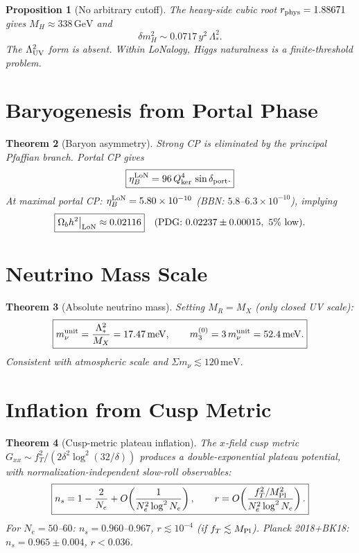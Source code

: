 \documentclass[12pt]{article}
\theoremstyle{plain}
\newtheorem{theorem}{Theorem}[section]
\newtheorem{proposition}[theorem]{Proposition}
\theoremstyle{definition}
\numberwithin{equation}{section}
\newcommand{\kker}{\mathrm{ker}}
\begin{document}
\begin{proposition}[No arbitrary cutoff]\label{prop:hierarchy}
The heavy-side cubic root $r_{\rm phys}=1.88671$ gives $M_H\approx338\,\mathrm{GeV}$ and
\[
\boxed{\delta m_H^2 \sim 0.0717\,y^2\,\Lambda_*^2.}
\]
The $\Lambda_{\rm UV}^2$ form is absent.  Within LoNalogy, Higgs naturalness is a finite-threshold problem.
\end{proposition}

\section{Baryogenesis from Portal Phase}\label{sec:baryogenesis}

\begin{theorem}[Baryon asymmetry]\label{thm:baryogen}
Strong CP is eliminated by the principal Pfaffian branch.  Portal CP gives
\[
\boxed{\eta_B^{\rm LoN} = 96\,Q_{\kker}^4\,\sin\delta_{\rm port}.}
\]
At maximal portal CP: $\eta_B^{\rm LoN}=5.80\times10^{-10}$ (BBN: $5.8$--$6.3\times10^{-10}$), implying
\[
\boxed{\Omega_b h^2\big|_{\rm LoN}\approx0.02116}\quad(\text{PDG: }0.02237\pm0.00015,\ 5\%\text{ low}).
\]
\end{theorem}

\section{Neutrino Mass Scale}\label{sec:neutrino}

\begin{theorem}[Absolute neutrino mass]\label{thm:numass}
Setting $M_R=M_X$ (only closed UV scale):
\[
\boxed{m_\nu^{\rm unit}=\frac{\Lambda_*^2}{M_X}=17.47\,\mathrm{meV},\qquad m_3^{(0)}=3\,m_\nu^{\rm unit}=52.4\,\mathrm{meV}.}
\]
Consistent with atmospheric scale and $\Sigma m_\nu\lesssim120\,\mathrm{meV}$.
\end{theorem}

\section{Inflation from Cusp Metric}\label{sec:inflation}

\begin{theorem}[Cusp-metric plateau inflation]\label{thm:inflation}
The $x$-field cusp metric $G_{xx}\sim f_T^2/(2\delta^2\log^2(32/\delta))$ produces a double-exponential plateau potential, with normalization-independent slow-roll observables:
\[
\boxed{n_s=1-\frac{2}{N_e}+O\!\left(\frac{1}{N_e^2\log^2N_e}\right),\qquad
r=O\!\left(\frac{f_T^2/M_{\rm Pl}^2}{N_e^2\log^2N_e}\right).}
\]
For $N_e=50$--$60$: $n_s=0.960$--$0.967$, $r\lesssim10^{-4}$ (if $f_T\lesssim M_{\rm Pl}$).
Planck 2018+BK18: $n_s=0.965\pm0.004$, $r<0.036$.
\end{theorem}
\end{document}
